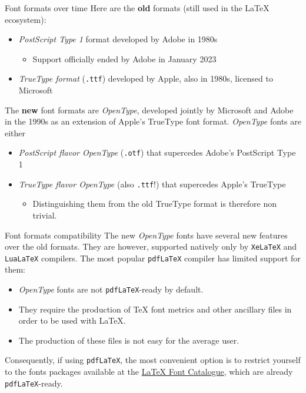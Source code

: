 \documentclass{beamer}
\newcommand{\hrefcol}[2]{\textcolor{gtbuzzgold}{\href{#1}{#2}}}
\begin{document}
\begin{frame}[fragile]{Font formats over time}
Here are the \textbf{old} formats (still used in the LaTeX ecosystem):

\begin{itemize}
\item \emph{PostScript Type 1} format developed by Adobe in 1980s
\begin{itemize}
    \item Support officially ended by Adobe in January 2023
\end{itemize}
\item \emph{TrueType format} (\verb|.ttf|) developed by Apple, also in 1980s, licensed to Microsoft
\end{itemize}

The \textbf{new} font formats are \emph{OpenType}, developed jointly by Microsoft and Adobe in the 1990s as an extension of Apple's TrueType font format. \emph{OpenType} fonts are either

\begin{itemize}
\item \emph{PostScript flavor OpenType} (\verb|.otf|) that supercedes Adobe's PostScript Type 1
\item \emph{TrueType flavor OpenType} (also \verb|.ttf|!) that supercedes Apple's TrueType
    \begin{itemize}
    \item Distinguishing them from the old TrueType format is therefore non trivial.
    \end{itemize}
\end{itemize}
\end{frame}


\begin{frame}[fragile]{Font formats compatibility}
The new \emph{OpenType} fonts have several new features over the old formats. They are however, supported natively only by \verb|XeLaTeX| and \verb|LuaLaTeX| compilers. The most popular \verb|pdfLaTeX| compiler has limited support for them:
\begin{itemize}
\item \emph{OpenType} fonts are not \verb|pdfLaTeX|-ready by default.
\item They require the production of TeX font metrics and other ancillary files in order to be used with LaTeX.
\item The production of these files is not easy for the average user.
\end{itemize}
Consequently, if using \verb|pdfLaTeX|, the most convenient option is to restrict yourself to the fonts packages available at the \hrefcol{https://tug.org/FontCatalogue/}{LaTeX Font Catalogue}, which are already \verb|pdfLaTeX|-ready.
\end{frame}
\end{document}
